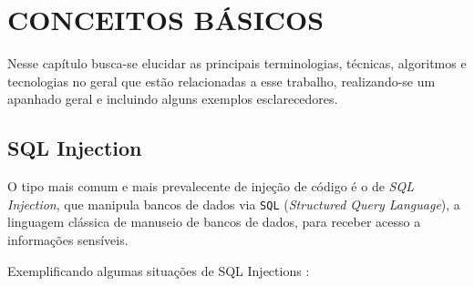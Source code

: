 \chapter{CONCEITOS BÁSICOS\textbf{}}
\label{chp:capitulo2}

Nesse capítulo busca-se elucidar as principais terminologias, técnicas, algoritmos e tecnologias no geral que estão relacionadas a esse trabalho, realizando-se um apanhado geral e incluindo alguns exemplos esclarecedores.

\section{SQL Injection}

O tipo mais comum e mais prevalecente de injeção de código é o de \textit{SQL Injection}, que manipula bancos de dados via \verb+SQL+ (\textit{Structured Query Language}), a linguagem clássica de manuseio de bancos de dados, para receber acesso a informações sensíveis.

Exemplificando algumas situações de SQL Injections \cite{sql_port_swigger}:


